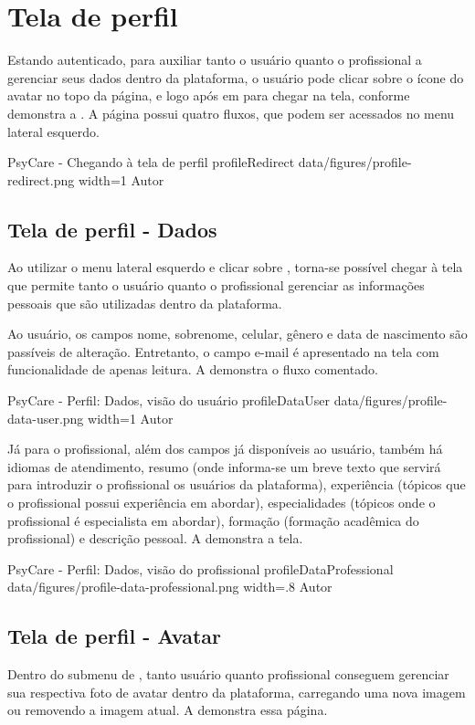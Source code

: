 \section{Tela de perfil}
\label{sec:perfil}

Estando autenticado, para auxiliar tanto o usuário quanto o profissional a gerenciar seus dados dentro da plataforma, o usuário pode clicar sobre o ícone do avatar no topo da página, e logo após em  para chegar na tela, conforme demonstra a . A página possui quatro fluxos, que podem ser acessados no menu lateral esquerdo.

\image
    {PsyCare - Chegando à tela de perfil}
    {profileRedirect}
    {data/figures/profile-redirect.png}
    {width=1\textwidth}
    {Autor}


\subsection{Tela de perfil - Dados}
\label{sec:perfilDados}
Ao utilizar o menu lateral esquerdo e clicar sobre , torna-se possível chegar à tela que permite tanto o usuário quanto o profissional gerenciar as informações pessoais que são utilizadas dentro da plataforma.

Ao usuário, os campos nome, sobrenome, celular, gênero e data de nascimento são passíveis de alteração. Entretanto, o campo e-mail é apresentado na tela com funcionalidade de apenas leitura. A  demonstra o fluxo comentado.

\image
    {PsyCare - Perfil: Dados, visão do usuário}
    {profileDataUser}
    {data/figures/profile-data-user.png}
    {width=1\textwidth}
    {Autor}

Já para o profissional, além dos campos já disponíveis ao usuário, também há idiomas de atendimento, resumo (onde informa-se um breve texto que servirá para introduzir o profissional os usuários da plataforma), experiência (tópicos que o profissional possui experiência em abordar), especialidades (tópicos onde o profissional é especialista em abordar), formação (formação acadêmica do profissional) e descrição pessoal. A  demonstra a tela.

\image
    {PsyCare - Perfil: Dados, visão do profissional}
    {profileDataProfessional}
    {data/figures/profile-data-professional.png}
    {width=.8\textwidth}
    {Autor}

\subsection{Tela de perfil - Avatar}
\label{sec:perfilAvatar}
Dentro do submenu de , tanto usuário quanto profissional conseguem gerenciar sua respectiva foto de avatar dentro da plataforma, carregando uma nova imagem ou removendo a imagem atual. A  demonstra essa página.

